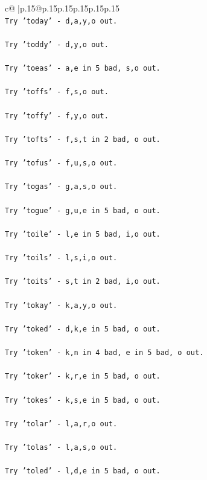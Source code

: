 \documentclass{article}
\begin{document}
{\begin{supertabular}{c@{$\;$}|p{.15\linewidth}@{}p{.15\linewidth}p{.15\linewidth}p{.15\linewidth}p{.15\linewidth}p{.15\linewidth}}
{{{\\ 
\texttt{Try 'today' {-} d,a,y,o out.} \\
\\ 
\texttt{Try 'toddy' {-} d,y,o out.} \\
\\ 
\texttt{Try 'toeas' {-} a,e in 5 bad, s,o out.} \\
\\ 
\texttt{Try 'toffs' {-} f,s,o out.} \\
\\ 
\texttt{Try 'toffy' {-} f,y,o out.} \\
\\ 
\texttt{Try 'tofts' {-} f,s,t in 2 bad, o out.} \\
\\ 
\texttt{Try 'tofus' {-} f,u,s,o out.} \\
\\ 
\texttt{Try 'togas' {-} g,a,s,o out.} \\
\\ 
\texttt{Try 'togue' {-} g,u,e in 5 bad, o out.} \\
\\ 
\texttt{Try 'toile' {-} l,e in 5 bad, i,o out.} \\
\\ 
\texttt{Try 'toils' {-} l,s,i,o out.} \\
\\ 
\texttt{Try 'toits' {-} s,t in 2 bad, i,o out.} \\
\\ 
\texttt{Try 'tokay' {-} k,a,y,o out.} \\
\\ 
\texttt{Try 'toked' {-} d,k,e in 5 bad, o out.} \\
\\ 
\texttt{Try 'token' {-} k,n in 4 bad, e in 5 bad, o out.} \\
\\ 
\texttt{Try 'toker' {-} k,r,e in 5 bad, o out.} \\
\\ 
\texttt{Try 'tokes' {-} k,s,e in 5 bad, o out.} \\
\\ 
\texttt{Try 'tolar' {-} l,a,r,o out.} \\
\\ 
\texttt{Try 'tolas' {-} l,a,s,o out.} \\
\\ 
\texttt{Try 'toled' {-} l,d,e in 5 bad, o out.} \\
}}}
\end{supertabular}}
\end{document}
